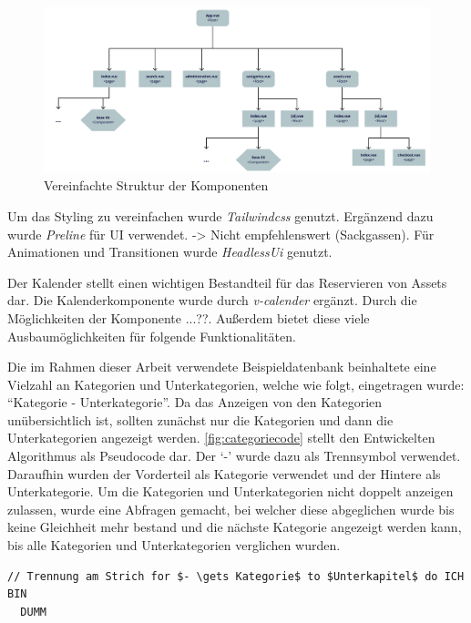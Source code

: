 \begin{figure}[h]
  \centering
  \includegraphics[scale=0.5]{Bilder/struktur.pdf}
  \caption[Vereinfachte Struktur der Komponenten]{Vereinfachte Struktur der Komponenten}
  \label{fig:Komponenten}
\end{figure}

Um das Styling zu vereinfachen wurde \textit{Tailwindcss} genutzt. Ergänzend
dazu wurde \textit{Preline} für UI verwendet. -> Nicht empfehlenswert
(Sackgassen). Für Animationen und Transitionen wurde \textit{HeadlessUi}
genutzt.

Der Kalender stellt einen wichtigen Bestandteil für das Reservieren von Assets
dar. Die Kalenderkomponente wurde durch \textit{v-calender} ergänzt. Durch die
Möglichkeiten der Komponente ...??. Außerdem bietet diese viele
Ausbaumöglichkeiten für folgende Funktionalitäten.

Die im Rahmen dieser Arbeit verwendete Beispieldatenbank beinhaltete eine
Vielzahl an Kategorien und Unterkategorien, welche wie folgt, eingetragen wurde:
\enquote{Kategorie - Unterkategorie}. Da das Anzeigen von den Kategorien
unübersichtlich ist, sollten zunächst nur die Kategorien und dann die
Unterkategorien angezeigt werden. \ref{fig:categoriecode} stellt den
Entwickelten Algorithmus als Pseudocode dar. Der \enquote*{-} wurde dazu als
Trennsymbol verwendet. Daraufhin wurden der Vorderteil als Kategorie verwendet
und der Hintere als Unterkategorie. Um die Kategorien und Unterkategorien nicht
doppelt anzeigen zulassen, wurde eine Abfragen gemacht, bei welcher diese
abgeglichen wurde bis keine Gleichheit mehr bestand und die nächste Kategorie
angezeigt werden kann, bis alle Kategorien und Unterkategorien verglichen
wurden.

\begin{lstlisting}[style=pseudo,gobble=2,caption={Pseudocode: Kategorien anzeigen},label=fig:categoriecode]
  // Trennung am Strich for $- \gets Kategorie$ to $Unterkapitel$ do ICH BIN
  DUMM
\end{lstlisting}


